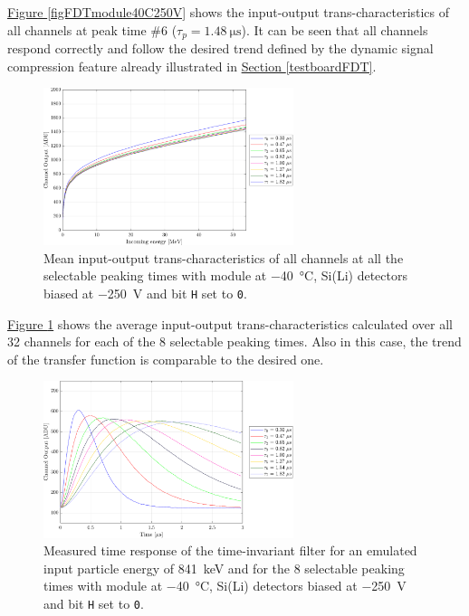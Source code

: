 \par
\hyperref[figFDTmodule40C250V]{Figure \ref{figFDTmodule40C250V}} shows the input-output trans-characteristics of all channels at peak time \#6 ($\tau_{p} = \SI{1.48}{\micro\second}$). It can be seen that all channels respond correctly and follow the desired trend defined by the dynamic signal compression feature already illustrated in \hyperref[testboardFDT]{Section \ref{testboardFDT}}.

\begin{figure}[h!]
    \centering
    \includegraphics[width=0.65\textwidth]{Images/chap3/results/FDT_MODULE_40C_250V_allpt.pdf}
    \caption{Mean input-output trans-characteristics of all channels at all the selectable
peaking times with module at \SI{-40}{\celsius}, Si(Li) detectors biased at \SI{-250}{\volt} and bit \texttt{H} set to \texttt{0}.}
    \label{figFDTmodule40C250VALLPT}
\end{figure}

\par
\hyperref[figFDTmodule40C250VALLPT]{Figure \ref{figFDTmodule40C250VALLPT}} shows the average input-output trans-characteristics calculated over all 32 channels for each of the 8 selectable peaking times. Also in this case, the trend of the transfer function is comparable to the desired one.

\begin{figure}[h!]
    \centering
    \includegraphics[width=0.65\textwidth]{Images/chap3/results/WAVEFORM_MODULE_40C_250V_allpt.pdf}
    \caption{Measured time response of the time-invariant filter for an emulated input particle energy of \SI{841}{\kilo\electronvolt} and for the 8 selectable peaking times with module at \SI{-40}{\celsius}, Si(Li) detectors biased at \SI{-250}{\volt} and bit \texttt{H} set to \texttt{0}.}
    \label{figWAVEmoduleALLPT}
\end{figure}

